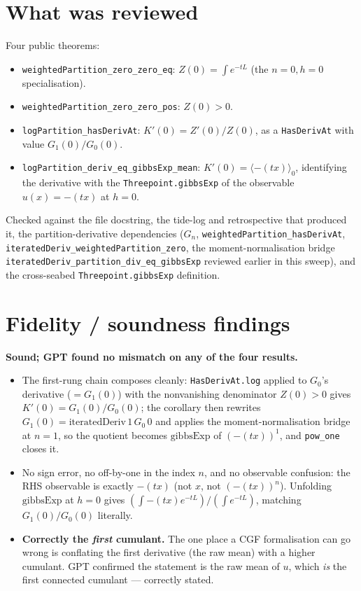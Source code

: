 \documentclass[11pt]{article}
\begin{document}
\section{What was reviewed}
Four public theorems:
\begin{itemize}[noitemsep]
  \item \texttt{weightedPartition\_zero\_zero\_eq}: $Z(0)=\int e^{-tL}$ (the $n=0,h=0$ specialisation).
  \item \texttt{weightedPartition\_zero\_zero\_pos}: $Z(0)>0$.
  \item \texttt{logPartition\_hasDerivAt}: $K'(0)=Z'(0)/Z(0)$, as a \texttt{HasDerivAt} with value
    $G_1(0)/G_0(0)$.
  \item \texttt{logPartition\_deriv\_eq\_gibbsExp\_mean}: $K'(0)=\langle-(tx)\rangle_0$, identifying the
    derivative with the \texttt{Threepoint.gibbsExp} of the observable $u(x)=-(tx)$ at $h=0$.
\end{itemize}
Checked against the file docstring, the tide-log and retrospective that produced it, the partition-derivative
dependencies ($G_n$, \texttt{weightedPartition\_hasDerivAt}, \texttt{iteratedDeriv\_weightedPartition\_zero},
the moment-normalisation bridge \texttt{iteratedDeriv\_partition\_div\_eq\_gibbsExp} reviewed earlier in this
sweep), and the cross-seabed \texttt{Threepoint.gibbsExp} definition.

\section{Fidelity / soundness findings}
\textbf{Sound; GPT found no mismatch on any of the four results.}
\begin{itemize}[noitemsep]
  \item The first-rung chain composes cleanly: \texttt{HasDerivAt.log} applied to $G_0$'s derivative
    ($=G_1(0)$) with the nonvanishing denominator $Z(0)>0$ gives $K'(0)=G_1(0)/G_0(0)$; the corollary then
    rewrites $G_1(0)=\mathrm{iteratedDeriv}\,1\,G_0\,0$ and applies the moment-normalisation bridge at $n=1$,
    so the quotient becomes $\mathrm{gibbsExp}$ of $(-(tx))^1$, and \texttt{pow\_one} closes it.
  \item No sign error, no off-by-one in the index $n$, and no observable confusion: the RHS observable is
    exactly $-(tx)$ (not $x$, not $(-(tx))^n$). Unfolding $\mathrm{gibbsExp}$ at $h=0$ gives
    $(\int -(tx)e^{-tL})/(\int e^{-tL})$, matching $G_1(0)/G_0(0)$ literally.
  \item \textbf{Correctly the \emph{first} cumulant.} The one place a CGF formalisation can go wrong is
    conflating the first derivative (the raw mean) with a higher cumulant. GPT confirmed the statement is the
    raw mean of $u$, which \emph{is} the first connected cumulant --- correctly stated.
\end{itemize}
\end{document}
